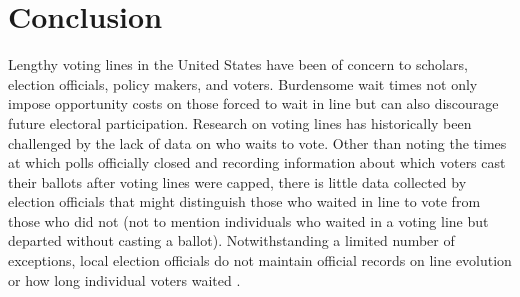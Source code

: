 \documentclass[12pt,titlepage]{article}
\begin{document}


\section*{Conclusion}




Lengthy voting lines in the United States have been of concern to
scholars, election officials, policy makers, and voters. Burdensome
wait times not only impose opportunity costs on those forced to wait
in line but can also discourage future electoral
participation. Research on voting lines has historically been
challenged by the lack of data on who waits to vote. Other than noting
the times at which polls officially closed and recording information
about which voters cast their ballots after voting lines were capped,
there is little data collected by election officials that might
distinguish those who waited in line to vote from those who did not
(not to mention individuals who waited in a voting line but departed
without casting a ballot).  Notwithstanding a limited number of
exceptions, local election officials do not maintain official records
on line evolution or how long individual voters waited
\citep{herron:confidence}.
\end{document}
